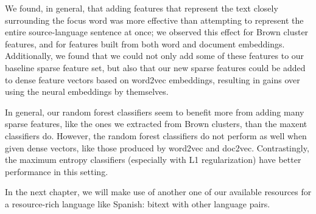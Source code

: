 We found, in general, that adding features that represent the text closely
surrounding the focus word was more effective than attempting to represent the
entire source-language sentence at once; we observed this effect for Brown
cluster features, and for features built from both word and document
embeddings.
Additionally, we found that we could not only add some of these features to our
baseline sparse feature set, but also that our new sparse features could be
added to dense feature vectors based on word2vec embeddings, resulting in gains
over using the neural embeddings by themselves.

In general, our random forest classifiers seem to benefit more from adding many
sparse features, like the ones we extracted from Brown clusters, than the
maxent classifiers do. However, the random forest classifiers do not perform as
well when given dense vectors, like those produced by word2vec and doc2vec.
Contrastingly, the maximum entropy classifiers (especially with L1
regularization) have better performance in this setting.

In the next chapter, we will make use of another one of our available resources
for a resource-rich language like Spanish: bitext with other language pairs.
